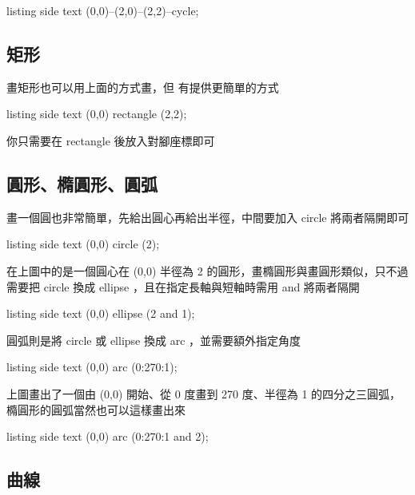 \begin{tcblisting}{listing side text}
\tikz {} (0,0)--(2,0)--(2,2)--cycle;
\end{tcblisting}

\subsection{矩形}

畫矩形也可以用上面的方式畫，但 \TikZ 有提供更簡單的方式

\begin{tcblisting}{listing side text}
\tikz \draw (0,0) rectangle (2,2);
\end{tcblisting}

你只需要在 rectangle 後放入對腳座標即可

\subsection{圓形、橢圓形、圓弧}

畫一個圓也非常簡單，先給出圓心再給出半徑，中間要加入 circle 將兩者隔開即可

\begin{tcblisting}{listing side text}
\tikz \draw (0,0) circle (2);
\end{tcblisting}

在上圖中的是一個圓心在 (0,0) 半徑為 2 的圓形，畫橢圓形與畫圓形類似，只不過需要把 circle 換成 ellipse ，且在指定長軸與短軸時需用 and 將兩者隔開

\begin{tcblisting}{listing side text}
\tikz \draw (0,0) ellipse (2 and 1);
\end{tcblisting}

圓弧則是將 circle 或 ellipse 換成 arc ，並需要額外指定角度

\begin{tcblisting}{listing side text}
\tikz \draw (0,0) arc (0:270:1);
\end{tcblisting}

上圖畫出了一個由 (0,0) 開始、從 0 度畫到 270 度、半徑為 1 的四分之三圓弧，橢圓形的圓弧當然也可以這樣畫出來

\begin{tcblisting}{listing side text}
\tikz \draw (0,0) arc (0:270:1 and 2);
\end{tcblisting}

\subsection{曲線}

